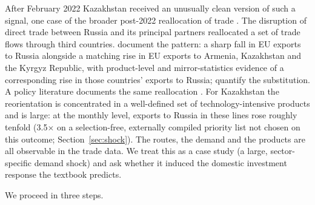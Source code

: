 \documentclass[12pt]{article}
\begin{document}
After February 2022 Kazakhstan received an unusually clean version of such a signal, one case
of the broader post-2022 reallocation of trade
\citep{aiyar2023geoeconomic,alfarochor2023reallocation}. The
disruption of direct trade between Russia and its principal partners reallocated a set of
trade flows through third countries. \citet{chupilkin2026roundabout} document the
pattern: a sharp fall in EU exports to Russia alongside a matching rise in EU exports to
Armenia, Kazakhstan and the Kyrgyz Republic, with product-level and mirror-statistics evidence
of a corresponding rise in those countries' exports to Russia;
\citet{chupilkin2025intermediated} quantify the substitution. A policy literature documents
the same reallocation \citep{simola2023bofit,kse2024exportcontrols,wisniewska2025osw}.
For Kazakhstan the reorientation is concentrated in a well-defined set of
technology-intensive products and is large: at the monthly level, exports to Russia in these
lines rose roughly tenfold (3.5$\times$ on a selection-free, externally compiled priority list
not chosen on this outcome; Section~\ref{sec:shock}). The routes, the demand and the products are all observable in the
trade data. We treat this as a case study (a large, sector-specific demand
shock) and ask whether it induced the domestic investment response the textbook predicts.

We proceed in three steps.
\end{document}
